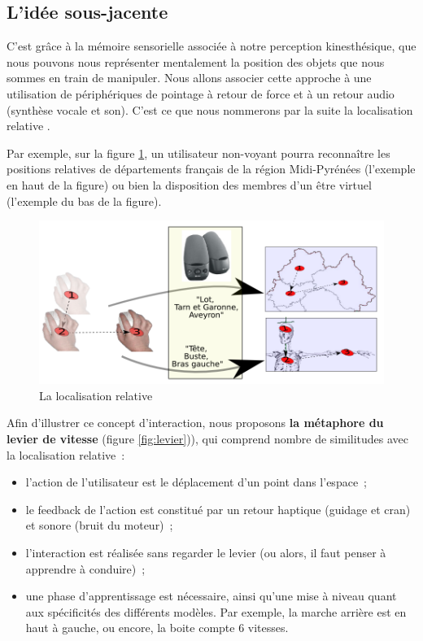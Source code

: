 \documentclass[
]{book}
\providecommand{\tightlist}{%
  \setlength{\itemsep}{0pt}\setlength{\parskip}{0pt}}
\begin{document}
\hypertarget{liduxe9e-sous-jacente}{%
\subsection{L'idée sous-jacente}\label{liduxe9e-sous-jacente}}

C'est grâce à la mémoire sensorielle associée à notre perception
kinesthésique, que nous pouvons nous représenter mentalement la position des
objets que nous sommes en train de manipuler. Nous allons associer cette
approche à une utilisation de périphériques de pointage à retour de force et
à un retour audio (synthèse vocale et son). C'est ce que nous nommerons par
la suite la localisation relative .

Par exemple, sur la figure \ref{fig:localisation}, un
utilisateur non-voyant pourra reconnaître les positions relatives de
départements français de la région Midi-Pyrénées (l'exemple en haut de la
figure) ou bien la disposition des membres d'un être virtuel (l'exemple du
bas de la figure).

\begin{figure}
\centering
\includegraphics{img/manip.png}
\caption{\label{fig:localisation}La localisation relative}
\end{figure}

Afin d'illustrer ce concept d'interaction, nous proposons \textbf{la métaphore
du levier de vitesse} (figure \ref{fig:levier})), qui comprend nombre de
similitudes avec la localisation relative~:

\begin{itemize}
\tightlist
\item
  l'action de l'utilisateur est le déplacement d'un
  point dans l'espace~;
\item
  le feedback de l'action est constitué par un retour
  haptique (guidage et cran) et sonore (bruit du moteur)~;
\item
  l'interaction est réalisée sans regarder le levier
  (ou alors, il faut penser à apprendre à conduire)~;
\item
  une phase d'apprentissage est nécessaire, ainsi
  qu'une mise à niveau quant aux spécificités des différents modèles. Par
  exemple, la marche arrière est en haut à gauche, ou encore, la boite compte
  6 vitesses.
\end{itemize}
\end{document}
